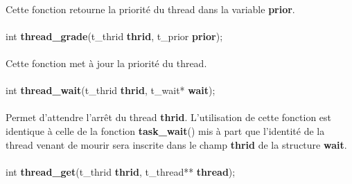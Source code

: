 \documentclass[10pt,a4wide]{article}
\begin{document}
\paragraph{}

Cette fonction retourne la priorit\'e du thread dans la variable
\textbf{prior}.

\paragraph{}

\hspace{1.5cm}int \textbf{thread\_grade}(t\_thrid \textbf{thrid},
                                         t\_prior \textbf{prior});

\paragraph{}

Cette fonction met \`a jour la priorit\'e du thread.

\paragraph{}

\hspace{1.5cm}int \textbf{thread\_wait}(t\_thrid \textbf{thrid},
                                        t\_wait* \textbf{wait});

\paragraph{}

Permet d'attendre l'arr\^et du thread \textbf{thrid}. L'utilisation
de cette fonction est identique \`a celle de la fonction
\textbf{task\_wait}() mis \`a part que l'identit\'e de la thread
venant de mourir sera inscrite dans le champ \textbf{thrid} de la structure
\textbf{wait}.

\paragraph{}

\hspace{1.5cm}int \textbf{thread\_get}(t\_thrid \textbf{thrid},
                                       t\_thread** \textbf{thread});

\paragraph{}
\end{document}
